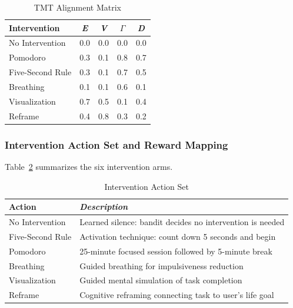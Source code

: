\documentclass[conference]{IEEEtran}
\begin{document}
\begin{table}[htbp]
\caption{TMT Alignment Matrix}
\label{tab_tmt_alignment}
\begin{center}
\footnotesize
\begin{tabular}{|p{2.0cm}|c|c|c|c|}
\hline
\textbf{Intervention} & \textbf{\textit{E}} & \textbf{\textit{V}} & \textbf{\textit{$\Gamma$}} & \textbf{\textit{D}} \\
\hline
No Intervention & 0.0 & 0.0 & 0.0 & 0.0 \\
\hline
Pomodoro & 0.3 & 0.1 & 0.8 & 0.7 \\
\hline
Five-Second Rule & 0.3 & 0.1 & 0.7 & 0.5 \\
\hline
Breathing & 0.1 & 0.1 & 0.6 & 0.1 \\
\hline
Visualization & 0.7 & 0.5 & 0.1 & 0.4 \\
\hline
Reframe & 0.4 & 0.8 & 0.3 & 0.2 \\
\hline
\end{tabular}
\end{center}
\end{table}

\subsubsection{Intervention Action Set and Reward Mapping}
Table~\ref{tab_interventions} summarizes the six intervention arms.

\begin{table}[htbp]
\caption{Intervention Action Set}
\label{tab_interventions}
\begin{center}
\footnotesize
\begin{tabular}{|p{2.0cm}|p{5.3cm}|}
\hline
\textbf{Action} & \textbf{\textit{Description}} \\
\hline
No Intervention & Learned silence: bandit decides no intervention is needed \\
\hline
Five-Second Rule & Activation technique: count down 5 seconds and begin \\
\hline
Pomodoro & 25-minute focused session followed by 5-minute break \cite{b2} \\
\hline
Breathing & Guided breathing for impulsiveness reduction \\
\hline
Visualization & Guided mental simulation of task completion \\
\hline
Reframe & Cognitive reframing connecting task to user's life goal \\
\hline
\end{tabular}
\end{center}
\end{table}
\end{document}
